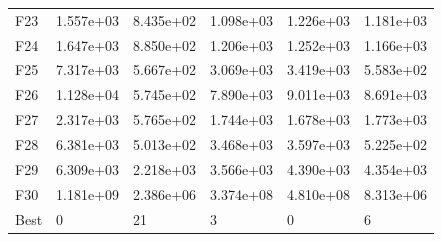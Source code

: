 \begin{tabular}{llllll}
F23  &  1.557e+03 &  8.435e+02 &  1.098e+03 &  1.226e+03 &  1.181e+03 \\
F24  &  1.647e+03 &  8.850e+02 &  1.206e+03 &  1.252e+03 &  1.166e+03 \\
F25  &  7.317e+03 &  5.667e+02 &  3.069e+03 &  3.419e+03 &  5.583e+02 \\
F26  &  1.128e+04 &  5.745e+02 &  7.890e+03 &  9.011e+03 &  8.691e+03 \\
F27  &  2.317e+03 &  5.765e+02 &  1.744e+03 &  1.678e+03 &  1.773e+03 \\
F28  &  6.381e+03 &  5.013e+02 &  3.468e+03 &  3.597e+03 &  5.225e+02 \\
F29  &  6.309e+03 &  2.218e+03 &  3.566e+03 &  4.390e+03 &  4.354e+03 \\
F30  &  1.181e+09 &  2.386e+06 &  3.374e+08 &  4.810e+08 &  8.313e+06 \\
Best &          0 &         21 &          3 &          0 &          6 \\
\bottomrule
\end{tabular}
